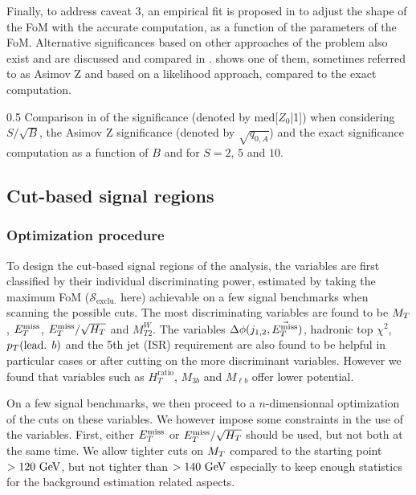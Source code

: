     Finally, to address caveat 3, an empirical fit is proposed in \cite{Punzi} to adjust the
    shape of the FoM with the accurate computation, as a function of the parameters
    of the FoM. Alternative significances based on other approaches of the problem also
    exist and are discussed and compared in \cite{FOMLinnemann, FOMCousins, FOMCowan}.
     shows one of them, sometimes referred to as Asimov Z and based on a
    likelihood approach, compared to the exact computation.

                 {0.5}
                 {Comparison in \cite{FOMCowan} of the significance (denoted by med[$Z_0$|1])
                 when considering $S/\sqrt{B}$, the Asimov Z significance (denoted by $\sqrt{q_{0,A}}$) and
                 the exact significance computation as a function of $B$ and for $S = 2$, $5$ and $10$.}

        \subsection{Cut-based signal regions}

            \subsubsection{Optimization procedure}

    To design the cut-based signal regions of the analysis, the variables are first
    classified by their individual discriminating power, estimated by taking the
    maximum FoM ($\mathcal{S}_\text{exclu.}$ here) achievable on a few signal benchmarks when scanning the possible
    cuts. The most discriminating variables are found to be $M_T$, $E_T^\text{miss}$,
    $E_T^\text{miss}/\sqrt{H_T}$ and $M_{T2}^{W}$. The variables $\Delta \phi(j_{1,2},\vec{E_T^\text{miss}})$,
    hadronic top $\chi^2$, $p_T(\text{lead. } b)$ and the 5th jet (ISR) requirement are
    also found to be helpful in particular cases or after cutting on the more discriminant
    variables. However we found that variables such as $H_T^\text{ratio}$, $M_{3b}$ and
    $M_{\ell b}$ offer lower potential.

    On a few signal benchmarks, we then proceed to a $n$-dimensionnal optimization of the
    cuts on these variables. We however impose some constraints in the use of the variables.
    First, either $E_T^\text{miss}$ or $E_T^\text{miss}/\sqrt{H_T}$ should be used, but not both at the same time.
    We allow tighter cuts on $M_T$ compared to the starting point $> 120~\text{GeV}$, but not
    tighter than $> 140~\text{GeV}$ especially to keep enough statistics for the background
    estimation related aspects.

